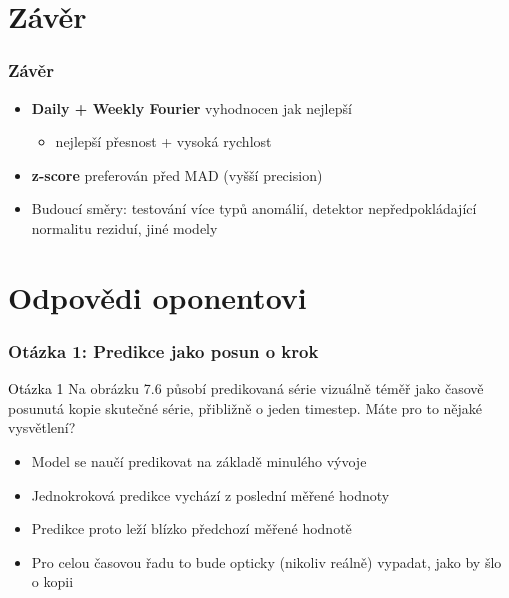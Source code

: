 \documentclass[czech,blue]{ctufit-presentation}
\begin{document}
\section{Závěr}
\begin{frame}
	\frametitle{Závěr}
	\begin{itemize}
		\item \textbf{Daily + Weekly Fourier} vyhodnocen jak nejlepší
			\begin{itemize}
				\item nejlepší přesnost + vysoká rychlost
			\end{itemize}
		\item \textbf{z-score} preferován před MAD (vyšší precision)
		\item Budoucí směry: testování více typů anomálií, detektor nepředpokládající normalitu reziduí, jiné modely
	\end{itemize}
\end{frame}

\begin{plainFrame}[colourbg]
\end{plainFrame}

\section{Odpovědi oponentovi}

\begin{frame}
	\frametitle{Otázka 1: Predikce jako posun o krok}
	\begin{block}{\textcolor{black}{Otázka 1}}
		Na obrázku 7.6 působí predikovaná série vizuálně téměř jako časově posunutá kopie
skutečné série, přibližně o jeden timestep. Máte pro to nějaké vysvětlení?
	\end{block}
	\begin{itemize}
		\item Model se naučí predikovat na základě minulého vývoje
		\item Jednokroková predikce vychází z poslední měřené hodnoty 
		\item Predikce proto leží blízko předchozí měřené hodnotě
		\item Pro celou časovou řadu to bude opticky (nikoliv reálně) vypadat, jako by šlo o kopii
	\end{itemize}
\end{frame}
\end{document}
